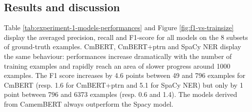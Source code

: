


\subsection{Results and discussion}
Table \ref{tab:experiment-1-models-performances} and Figure \ref{fig:f1-vs-trainsize} display the averaged precision, recall and F1-score for all models on the 8 subsets of ground-truth examples.
CmBERT, CmBERT+ptrn and SpaCy NER display the same behaviour: performances increase dramatically with the number of training examples and rapidly reach an area of slower progress around 1000 examples.
The F1 score increases by 4.6 points between 49 and 796 examples for CmBERT (resp. 1.6 for CmBERT+ptrn and 5.1 for SpaCy NER) but only by 1 point between 796 and 6373 examples (resp. 0.6 and 1.4).
The models derived from CamemBERT always outperform the Spacy model.

